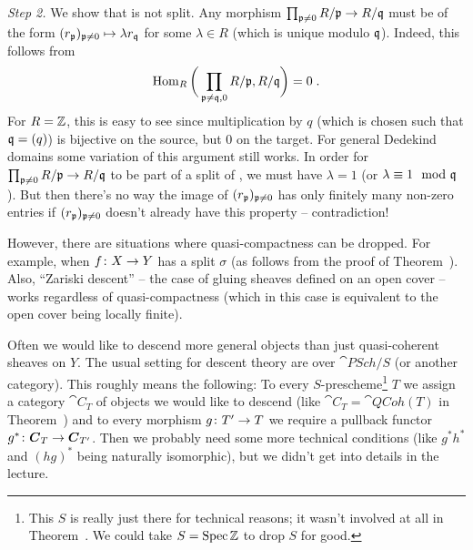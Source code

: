 \documentclass[a4paper,parskip=half,numbers=enddot, DIV=12]{scrreprt}
\begin{document}
\begin{rem}
	\emph{Step 2.} We show that  is not split. Any morphism $\prod_{\pp\neq 0}R/\pp\morphism R/\qq$ must be of the form $(r_{\mathfrak{p}})_{\mathfrak{p}\neq 0}\mapsto \lambda r_{\mathfrak{q}}$ for some $\lambda\in R$ (which is unique modulo $\mathfrak{q}$). Indeed, this follows from
	\begin{align*}
		\operatorname{Hom}_R\bigg(\prod_{\mathfrak{p}\neq\mathfrak{q},0}R/\mathfrak{p},R/\mathfrak{q}\bigg)=0\;.
	\end{align*}
	For $R=\mathbb{Z}$, this is easy to see since multiplication by $q$ (which is chosen such that $\mathfrak{q}=(q)$) is bijective on the source, but $0$ on the target. For general Dedekind domains some variation of this argument still works. In order for $\prod_{\pp\neq 0}R/\pp\morphism R/\qq$ to be part of a split of , we must have $\lambda=1$ (or $\lambda\equiv1\mod {\mathfrak{q}}$). But then there's no way the image of $(r_{\mathfrak{p}})_{\mathfrak{p}\neq 0}$ has only finitely many non-zero entries if $(r_{\mathfrak{p}})_{\mathfrak{p}\neq 0}$ doesn't already have this property -- contradiction!
\end{rem}
\begin{rem}
	However, there are situations where quasi-compactness can be dropped. For example, when $f\colon X\morphism Y$ has a split $\sigma$ (as follows from the proof of Theorem~). Also, ``Zariski descent'' -- the case of gluing sheaves defined on an open cover -- works regardless of quasi-compactness (which in this case is equivalent to the open cover being locally finite).
\end{rem}
Often we would like to descend more general objects than just quasi-coherent sheaves on $Y$. The usual setting for descent theory are  over $\cat{PSch}/S$ (or another category). This roughly means the following: To every $S$-prescheme\footnote{This $S$ is really just there for technical reasons; it wasn't involved at all in Theorem~. We could take $S=\operatorname{Spec} \mathbb{Z}$ to drop $S$ for good.} $T$ we assign a category $\cat C_T$ of objects we would like to descend (like $\cat C_T=\cat{QCoh}(T)$ in Theorem~) and to every morphism $g\colon T'\morphism T$ we require a pullback functor $g^*\colon \cat{C}_T\morphism\cat C_{T'}$. Then we probably need some more technical conditions (like $g^*h^*$ and $(hg)^*$ being naturally isomorphic), but we didn't get into details in the lecture.
\end{document}
